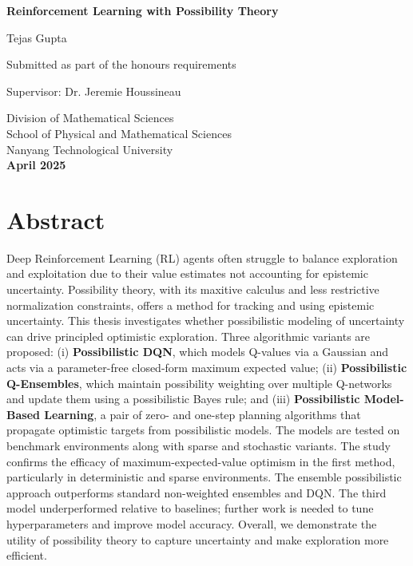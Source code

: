 \documentclass[11pt,a4paper]{report}
\begin{document}
\begin{titlepage}
    \centering
    \vspace*{3cm}
    {\Huge\bfseries Reinforcement Learning with Possibility Theory \par}
    \vspace{2cm}
    {\Large Tejas Gupta \par}
    \vspace{1.5cm}
    Submitted as part of the honours requirements \par
    \vspace{1cm}
    Supervisor: Dr. Jeremie Houssineau \par
    \vfill
    Division of Mathematical Sciences \\
    School of Physical and Mathematical Sciences \\
    Nanyang Technological University \\
    \vspace{1cm}
    \textbf{April 2025}
\end{titlepage}

\chapter*{Abstract}
Deep Reinforcement Learning (RL) agents often struggle to balance exploration and exploitation due to their value estimates not accounting for epistemic uncertainty. Possibility theory, with its maxitive calculus and less restrictive normalization constraints, offers a method for tracking and using epistemic uncertainty. This thesis investigates whether possibilistic modeling of uncertainty can drive principled optimistic exploration. Three algorithmic variants are proposed: (i) \textbf{Possibilistic DQN}, which models Q-values via a Gaussian and acts via a parameter-free closed-form maximum expected value; (ii) \textbf{Possibilistic Q-Ensembles}, which maintain possibility weighting over multiple Q-networks and update them using a possibilistic Bayes rule; and (iii) \textbf{Possibilistic Model-Based Learning}, a pair of zero- and one-step planning algorithms that propagate optimistic targets from possibilistic models. The models are tested on benchmark environments along with sparse and stochastic variants. The study confirms the efficacy of maximum-expected-value optimism in the first method, particularly in deterministic and sparse environments. The ensemble possibilistic approach outperforms standard non-weighted ensembles and DQN. The third model underperformed relative to baselines; further work is needed to tune hyperparameters and improve model accuracy. Overall, we demonstrate the utility of possibility theory to capture uncertainty and make exploration more efficient.
\end{document}
